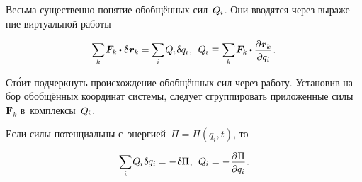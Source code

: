 \begin{otherlanguage}{russian}
Весьма существенно понятие обобщённых сил~${Q_{\hspace{-0.1ex}i}}$. Они вводятся через выражение виртуальной работы

\nopagebreak\vspace{-0.25em}\begin{equation}
\scalebox{0.92}[0.96]{$ \displaystyle \sum_{\smash{k}} $} \hspace{.16ex}
\bm{F}_k \hspace{-0.1ex} \dotp \variation{\hspace{.1ex}\bm{r}_k} \hspace{-0.1ex}
= \hspace{-0.1ex} \scalebox{0.92}[0.96]{$\displaystyle \sum_{i}$} \hspace{.16ex} Q_{\hspace{-0.1ex}i} \hspace{.12ex} \variation{q_i} \hspace{.1ex} ,
\:\:
Q_{\hspace{-0.1ex}i} \equiv
\scalebox{0.92}[0.96]{$ \displaystyle \sum_{\smash{k}} $} \hspace{.16ex}
\bm{F}_k \hspace{-0.1ex} \dotp \scalebox{0.96}{$ \displaystyle \frac{\raisemath{-0.12em}{\partial \hspace{.1ex} \bm{r}_k}}{\raisemath{-0.1em}{\partial q_i}} $} \hspace{.16ex} .
\vspace{-0.1em}\end{equation}

\vspace{-0.15em} \noindent Ст\'{о}ит подчеркнуть происхождение обобщённых сил через работу. Установив набор обобщённых координат системы, следует сгруппировать приложенные силы~${\bm{F}_k}$ в~комплексы~${Q_{\hspace{-0.1ex}i}}$.

Если силы потенциальны с~энергией~${\Pi \!=\! \Pi(q_i, t)}$, то

\nopagebreak\vspace{-0.2em}\begin{equation}
\scalebox{0.92}[0.96]{$\displaystyle \sum_{i}$} \hspace{.16ex} Q_{\hspace{-0.1ex}i} \hspace{.12ex} \variation{q_i} \hspace{-0.1ex}
= - \hspace{.16ex} \variation{\Pi} \hspace{.1ex} ,
\:\:
Q_{\hspace{-0.1ex}i} = - \hspace{.16ex} \scalebox{0.96}{$ \displaystyle \frac{\raisemath{-0.12em}{\partial \hspace{.1ex} \Pi}}{\raisemath{-0.1em}{\partial q_i}} $} \hspace{.16ex} .
\vspace{-0.1em}\end{equation}


\end{otherlanguage}
